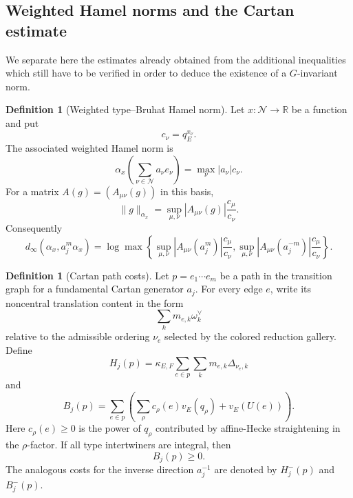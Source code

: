 \documentclass[12pt]{article}
\theoremstyle{definition}
\newtheorem{definition}[theorem]{Definition}
\theoremstyle{remark}
\begin{document}
\subsection{Weighted Hamel norms and the Cartan estimate}

We separate here the estimates already obtained from the additional
inequalities which still have to be verified in order to deduce the existence
of a \(G\)-invariant norm.

\begin{definition}[Weighted type--Bruhat Hamel norm]
\label{def:weighted-type-Bruhat-Hamel-norm}
Let \(x:\mathscr N\to\mathbb R\) be a function and put
\[
 c_\nu=q_E^{x_\nu}.
\]
The associated weighted Hamel norm is
\[
 \alpha_x\left(\sum_{\nu\in\mathscr N}a_\nu e_\nu\right)
 =
 \max_{\nu}|a_\nu|c_\nu.
\]
For a matrix \(A(g)=(A_{\mu\nu}(g))\) in this basis,
\[
 \|g\|_{\alpha_x}
 =
 \sup_{\mu,\nu}
 |A_{\mu\nu}(g)|\frac{c_\mu}{c_\nu}.
\]
Consequently
\begin{equation}\label{eq:dinf-explicit-matrix-section8}
 d_\infty(\alpha_x,a_j^m\alpha_x)
 =
 \log
 \max\left\{
 \sup_{\mu,\nu}
 |A_{\mu\nu}(a_j^m)|\frac{c_\mu}{c_\nu},
 \sup_{\mu,\nu}
 |A_{\mu\nu}(a_j^{-m})|\frac{c_\mu}{c_\nu}
 \right\}.
\end{equation}
\end{definition}

\begin{definition}[Cartan path costs]
\label{def:Cartan-path-costs-section8}
Let \(p=e_1\cdots e_m\) be a path in the transition graph for a fundamental
Cartan generator \(a_j\).  For every edge \(e\), write its noncentral
translation content in the form
\[
 \sum_k m_{e,k}\omega_k^\vee
\]
relative to the admissible ordering \(\nu_e\) selected by the colored
reduction gallery.  Define
\begin{equation}\label{eq:path-cost}
 H_j(p)
 =
 \kappa_{E,F}
 \sum_{e\in p}\sum_km_{e,k}\Delta_{\nu_e,k}
\end{equation}
and
\begin{equation}\label{eq:residual-integral-path-cost}
 B_j(p)
 =
 \sum_{e\in p}
 \left(
 \sum_\rho c_\rho(e)v_E(q_\rho)
 +
 v_E(U(e))
 \right).
\end{equation}
Here \(c_\rho(e)\geq0\) is the power of \(q_\rho\) contributed by affine-Hecke
straightening in the \(\rho\)-factor.  If all type intertwiners are integral,
then
\[
 B_j(p)\geq0.
\]
The analogous costs for the inverse direction \(a_j^{-1}\) are denoted by
\(H_j^-(p)\) and \(B_j^-(p)\).
\end{definition}
\end{document}
